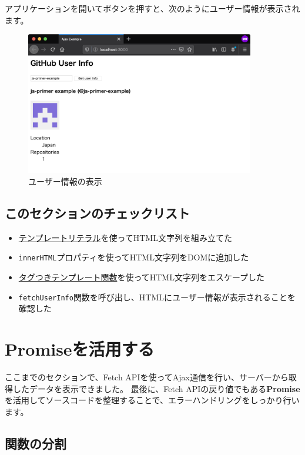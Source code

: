 アプリケーションを開いてボタンを押すと、次のようにユーザー情報が表示されます。

\begin{figure}[h]
\centering
\includegraphics[width=100mm]{fig/fig-4.png}
\caption{ユーザー情報の表示}
\end{figure}

\hypertarget{section-checklist}{%
\subsection{このセクションのチェックリスト}\label{section-checklist}}

\begin{itemize}
\item
  \hyperlink{create}{テンプレートリテラル}を使ってHTML文字列を組み立てた
\item
  \texttt{innerHTML}プロパティを使ってHTML文字列をDOMに追加した
\item
  \hyperlink{tagged-template-function}{タグつきテンプレート関数}を使ってHTML文字列をエスケープした
\item
  \texttt{fetchUserInfo}関数を呼び出し、HTMLにユーザー情報が表示されることを確認した
\end{itemize}

\hypertarget{use-promise}{%
\section{Promiseを活用する}\label{use-promise}}

ここまでのセクションで、Fetch
APIを使ってAjax通信を行い、サーバーから取得したデータを表示できました。
最後に、Fetch
APIの戻り値でもある\textbf{Promise}を活用してソースコードを整理することで、エラーハンドリングをしっかり行います。

\hypertarget{split-function}{%
\subsection{関数の分割}\label{split-function}}

